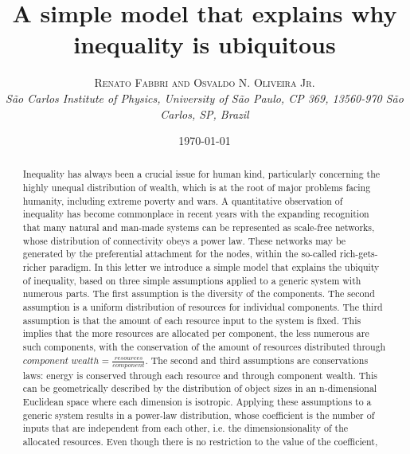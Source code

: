 \documentclass[a4paper, 11pt]{article} %
\title{\textbf{A simple model that explains why inequality is ubiquitous}\\ %
} %
\author{\textsc{Renato Fabbri and Osvaldo N. Oliveira Jr.} %
\\{\textit{São Carlos Institute of Physics, University of São Paulo, CP 369, 13560-970 São Carlos, SP, Brazil}}} %
\date{\today} %
\makeatletter
\renewcommand{\maketitle}{ %
\begin{flushright} %
{\LARGE\@title} %

\vspace{5pt} %

{\large\@author} %
\\\@date %

\vspace{1pt} %
\end{flushright}
}
\makeatother
\begin{document}
\maketitle %



%
\begin{abstract}
	Inequality has always been a crucial issue for human kind, particularly concerning the highly unequal distribution of wealth, which is at the root of major problems facing humanity, including extreme poverty and wars.
	A quantitative observation of inequality has become commonplace in recent years
	with the expanding recognition that many natural and man-made systems can be represented as scale-free networks,
	whose distribution of connectivity obeys a power law.
	These networks may be generated by the preferential attachment for the nodes, within the so-called rich-gets-richer paradigm.
	In this letter we introduce a simple model that explains the ubiquity of inequality, based on three simple assumptions applied to a generic system with numerous parts.
	The first assumption is the diversity of the components.
	The second assumption is a uniform distribution of resources for individual components.
	The third assumption is that the amount of each resource input to the system is fixed.
	This implies that the more resources are allocated per component, the less numerous are such components,
	with the conservation of the amount of resources distributed through $component\; wealth = \frac{resources}{component}$.
	The second and third assumptions are conservations laws: energy is conserved through each resource and through component wealth.
	This can be geometrically described by the distribution of object sizes in an n-dimensional Euclidean space where each dimension is isotropic.
	Applying these assumptions to a generic system results in a power-law distribution, whose coefficient is the number of inputs that are independent from each other, i.e. the dimensionsionality of the allocated resources.
	Even though there is no restriction to the value of the coefficient,

\end{abstract}
\end{document}
